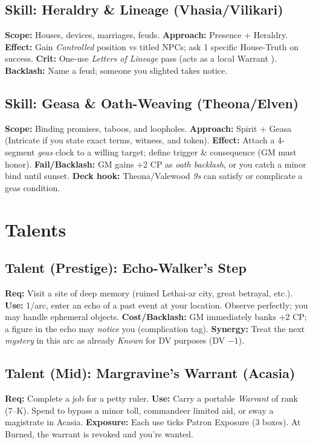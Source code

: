 \subsection{Skill: Heraldry \& Lineage (Vhasia/Vilikari)}
\textbf{Scope:} Houses, devices, marriages, feuds.
\textbf{Approach:} Presence + Heraldry.
\textbf{Effect:} Gain \emph{Controlled} position vs titled NPCs; ask 1 specific House-Truth on success.
\textbf{Crit:} One-use \emph{Letters of Lineage} pass (acts as a local Warrant \SuitDiamond{}).
\textbf{Backlash:} Name a feud; someone you slighted takes notice.

\subsection{Skill: Geasa \& Oath-Weaving (Theona/Elven)}
\textbf{Scope:} Binding promises, taboos, and loopholes.
\textbf{Approach:} Spirit + Geasa (Intricate if you state exact terms, witness, and token).
\textbf{Effect:} Attach a 4-segment \emph{geas} clock to a willing target; define trigger \& consequence (GM must honor).
\textbf{Fail/Backlash:} GM gains +2 CP as \emph{oath backlash}, or you catch a minor bind until sunset.
\textbf{Deck hook:} Theona/Valewood \emph{9s} can satisfy or complicate a geas condition.

\section{Talents}

\subsection{Talent (Prestige): Echo-Walker's Step}
\textbf{Req:} Visit a site of deep memory (ruined Lethai-ar city, great betrayal, etc.).
\textbf{Use:} 1/arc, enter an echo of a past event at your location. Observe perfectly; you may handle ephemeral objects.
\textbf{Cost/Backlash:} GM immediately banks +2 CP; a figure in the echo may \emph{notice} you (complication tag).
\textbf{Synergy:} Treat the next \emph{mystery} \SuitClub{} in this arc as already \emph{Known} for DV purposes (DV $-1$).

\subsection{Talent (Mid): Margravine's Warrant (Acasia)}
\textbf{Req:} Complete a job for a petty ruler.
\textbf{Use:} Carry a portable \SuitDiamond{} \emph{Warrant} of rank (7--K). Spend to bypass a minor toll, commandeer limited aid, or sway a magistrate in Acasia.
\textbf{Exposure:} Each use ticks Patron Exposure (3 boxes). At Burned, the warrant is revoked and you're wanted.

